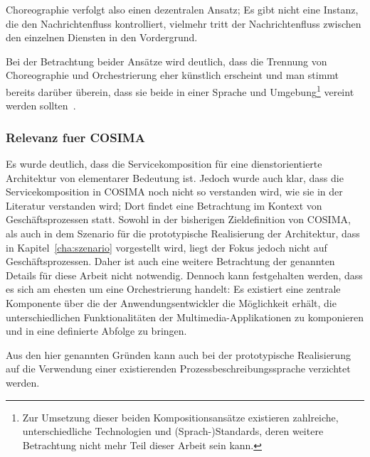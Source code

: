   Choreographie verfolgt also einen dezentralen Ansatz; Es gibt nicht eine Instanz, die den Nachrichtenfluss kontrolliert, vielmehr tritt der Nachrichtenfluss zwischen den einzelnen Diensten in den Vordergrund.
  
  Bei der Betrachtung beider Ansätze wird deutlich, dass die Trennung von Choreographie und Orchestrierung eher künstlich erscheint und man stimmt bereits darüber überein, dass sie beide in einer Sprache und Umgebung\footnote{Zur Umsetzung dieser beiden Kompositionsansätze existieren zahlreiche, unterschiedliche Technologien und (Sprach-)Standards, deren weitere Betrachtung nicht mehr Teil dieser Arbeit sein kann.} vereint werden sollten~\citep[S. 42]{papazoglou2007soc}.



\subsubsection{Relevanz fuer COSIMA} %
\label{ssub:relevanz_fuer_cosima_komposition}

  Es wurde deutlich, dass die Servicekomposition für eine dienstorientierte Architektur von elementarer Bedeutung ist. Jedoch wurde auch klar, dass die Servicekomposition in COSIMA noch nicht so verstanden wird, wie sie in der Literatur verstanden wird; Dort findet eine Betrachtung im Kontext von Geschäftsprozessen statt. Sowohl in der bisherigen Zieldefinition von COSIMA, als auch in dem Szenario für die prototypische Realisierung der Architektur, dass in Kapitel~\ref{cha:szenario} vorgestellt wird, liegt der Fokus jedoch nicht auf Geschäftsprozessen. Daher ist auch eine weitere Betrachtung der genannten Details für diese Arbeit nicht notwendig. Dennoch kann festgehalten werden, dass es sich am ehesten um eine Orchestrierung handelt: Es existiert eine zentrale Komponente über die der Anwendungsentwickler die Möglichkeit erhält, die unterschiedlichen Funktionalitäten der Multimedia-Applikationen zu komponieren und in eine definierte Abfolge zu bringen.
  
  Aus den hier genannten Gründen kann auch bei der prototypische Realisierung auf die Verwendung einer existierenden Prozessbeschreibungssprache verzichtet werden.


  
